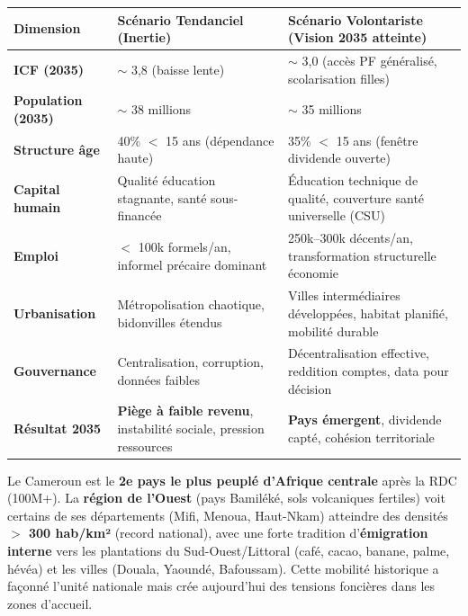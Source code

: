 \documentclass[11pt]{article}
\begin{document}
\begin{center}
\begin{tabularx}{\linewidth}{|l|X|X|}\hline
\textbf{Dimension} & \textbf{Scénario Tendanciel (Inertie)} & \textbf{Scénario Volontariste (Vision 2035 atteinte)} \\ \hline
\textbf{ICF (2035)} & $\sim$ 3,8 (baisse lente) & $\sim$ 3,0 (accès PF généralisé, scolarisation filles) \\ \hline
\textbf{Population (2035)} & $\sim$ 38 millions & $\sim$ 35 millions \\ \hline
\textbf{Structure âge} & 40\% $<$ 15 ans (dépendance haute) & 35\% $<$ 15 ans (fenêtre dividende ouverte) \\ \hline
\textbf{Capital humain} & Qualité éducation stagnante, santé sous-financée & Éducation technique de qualité, couverture santé universelle (CSU) \\ \hline
\textbf{Emploi} & $<$ 100k formels/an, informel précaire dominant & 250k--300k décents/an, transformation structurelle économie \\ \hline
\textbf{Urbanisation} & Métropolisation chaotique, bidonvilles étendus & Villes intermédiaires développées, habitat planifié, mobilité durable \\ \hline
\textbf{Gouvernance} & Centralisation, corruption, données faibles & Décentralisation effective, reddition comptes, data pour décision \\ \hline
\textbf{Résultat 2035} & \textbf{Piège à faible revenu}, instabilité sociale, pression ressources & \textbf{Pays émergent}, dividende capté, cohésion territoriale \\ \hline
\end{tabularx}
\end{center}

\begin{savaistu}
Le Cameroun est le \textbf{2e pays le plus peuplé d'Afrique centrale} après la RDC (100M+). La \textbf{région de l'Ouest} (pays Bamiléké, sols volcaniques fertiles) voit certains de ses départements (Mifi, Menoua, Haut-Nkam) atteindre des densités \textbf{$>$ 300 hab/km²} (record national), avec une forte tradition d'\textbf{émigration interne} vers les plantations du Sud-Ouest/Littoral (café, cacao, banane, palme, hévéa) et les villes (Douala, Yaoundé, Bafoussam). Cette mobilité historique a façonné l'unité nationale mais crée aujourd'hui des tensions foncières dans les zones d'accueil.
\end{savaistu}
\end{document}
